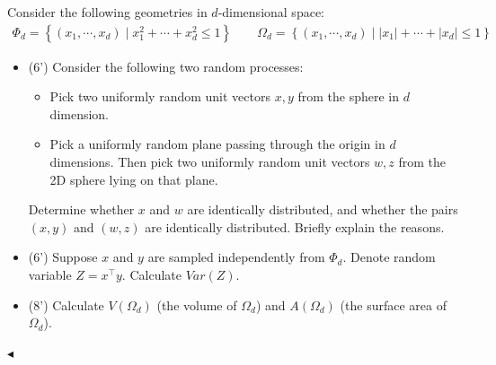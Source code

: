 ﻿\documentclass[11pt]{article}
\newenvironment{problem}[2][Problem]{\begin{trivlist}
\item[\hskip \labelsep {\bfseries #1}\hskip \labelsep {\bfseries #2.}]}{\hfill$\blacktriangleleft$\end{trivlist}}
\begin{document}
\begin{problem}{8 (20')} 
Consider the following geometries in $d$-dimensional space:
\begin{align*}
    \Phi_d=\left\{(x_1,\cdots,x_d)\mid x_1^2+\cdots+x_d^2\leq 1\right\}\qquad
    \Omega_d=\left\{(x_1,\cdots,x_d)\mid |x_1|+\cdots+|x_d|\leq 1\right\}
\end{align*}
\begin{itemize}
    \item [(1)] (6') Consider the following two random processes:
    \begin{itemize}
        \item Pick two uniformly random unit vectors $x,y$ from the sphere in $d$ dimension.
        \item Pick a uniformly random plane passing through the origin in $d$ dimensions. Then pick two uniformly random unit vectors $w,z$ from the 2D sphere lying on that plane.
    \end{itemize}
    Determine whether $x$ and $w$ are identically distributed, and whether the pairs $(x,y)$ and $(w,z)$ are identically distributed. Briefly explain the reasons.
    \item [(2)] (6') Suppose $x$ and $y$ are sampled independently from $\Phi_d$. Denote random variable $Z=x^\top y$. Calculate $Var(Z)$.
    \item [(3)] (8') Calculate $V(\Omega_d)$ (the volume of $\Omega_d$) and $A(\Omega_d)$ (the surface area of $\Omega_d$).
\end{itemize}
\end{problem}
\end{document}
